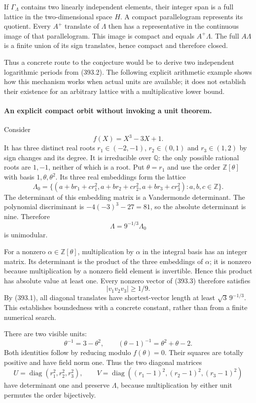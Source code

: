 \documentclass[11pt]{article}
\begin{document}
If $\Gamma_\Lambda$ contains two linearly independent elements,
their integer span is a full lattice in the two-dimensional space
$H$. A compact parallelogram represents its quotient. Every $A^+$
translate of $\Lambda$ then has a representative in the continuous
image of that parallelogram. This image is compact and equals
$A^+\Lambda$. The full $A\Lambda$ is a finite union of its sign
translates, hence compact and therefore closed.

Thus a concrete route to the conjecture would be to derive two
independent logarithmic periods from (393.2). The following explicit
arithmetic example shows how this mechanism works when actual units
are available; it does not establish their existence for an arbitrary
lattice with a multiplicative lower bound.

\paragraph{An explicit compact orbit without invoking a unit theorem.}
Consider
\[
 f(X)=X^3-3X+1.
\]
It has three distinct real roots $r_1\in(-2,-1)$,
$r_2\in(0,1)$ and $r_3\in(1,2)$ by sign changes and its degree.
It is irreducible over $\mathbb Q$: the only possible rational roots
are $1,-1$, neither of which is a root. Put $\theta=r_1$ and use
the order $\mathbb Z[\theta]$ with basis $1,\theta,\theta^2$.
Its three real embeddings form the lattice
\[
 \Lambda_0=\{(a+br_1+cr_1^2,
              a+br_2+cr_2^2,
              a+br_3+cr_3^2):a,b,c\in\mathbb Z\}.
\]
The determinant of this embedding matrix is a Vandermonde
determinant. The polynomial discriminant is
$-4(-3)^3-27=81$, so the absolute determinant is nine. Therefore
\[
 \Lambda=9^{-1/3}\Lambda_0
 \tag{393.3}
\]
is unimodular.

For a nonzero $\alpha\in\mathbb Z[\theta]$, multiplication by
$\alpha$ in the integral basis has an integer matrix. Its determinant
is the product of the three embeddings of $\alpha$; it is nonzero
because multiplication by a nonzero field element is invertible.
Hence this product has absolute value at least one. Every nonzero
vector of (393.3) therefore satisfies
\[
 |v_1v_2v_3|\geq1/9.
 \tag{393.4}
\]
By (393.1), all diagonal translates have shortest-vector length at
least $\sqrt3\,9^{-1/3}$. This establishes boundedness with a concrete
constant, rather than from a finite numerical search.

There are two visible units:
\[
 \theta^{-1}=3-\theta^2,\qquad
 (\theta-1)^{-1}=\theta^2+\theta-2.
 \tag{393.5}
\]
Both identities follow by reducing modulo $f(\theta)=0$.
Their squares are totally positive and have field norm one. Thus
the two diagonal matrices
\[
 U=\operatorname{diag}(r_1^2,r_2^2,r_3^2),\qquad
 V=\operatorname{diag}((r_1-1)^2,(r_2-1)^2,(r_3-1)^2)
 \tag{393.6}
\]
have determinant one and preserve $\Lambda$, because multiplication
by either unit permutes the order bijectively.
\end{document}
